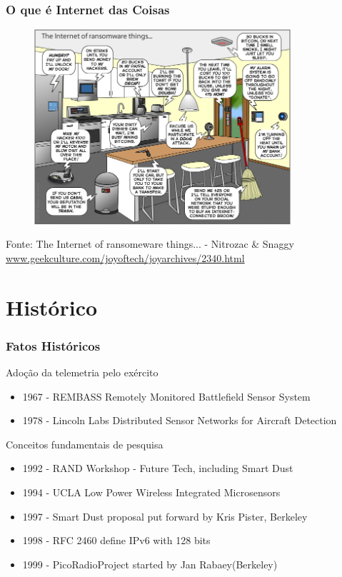 \documentclass[t]{beamer}
\begin{document}
\begin{frame}
	\frametitle{O que é Internet das Coisas}
	\begin{figure}
		\includegraphics[width=0.85\textwidth]{thejoyoftech-geekculture}
	\end{figure}
	\scriptsize Fonte: The Internet of ransomeware things... - Nitrozac \& Snaggy\\
	\tiny \url{www.geekculture.com/joyoftech/joyarchives/2340.html}
\end{frame}

\section{Histórico}

\begin{frame}
\frametitle{Fatos Históricos}

Adoção da telemetria pelo exército
\begin{itemize}
	\item 1967 - REMBASS Remotely Monitored Battlefield Sensor System
	\item 1978 - Lincoln Labs Distributed Sensor Networks for Aircraft Detection
\end{itemize}

Conceitos fundamentais de pesquisa

\begin{itemize}
	\item 1992 - RAND Workshop  - Future Tech, including Smart Dust
	\item 1994 - UCLA Low Power Wireless Integrated Microsensors
	\item 1997 - Smart Dust proposal put forward by Kris Pister, Berkeley
	\item 1998 - RFC 2460 define IPv6 with 128 bits
	\item 1999 - PicoRadioProject started by Jan Rabaey(Berkeley)
\end{itemize}

\end{frame}
\end{document}
